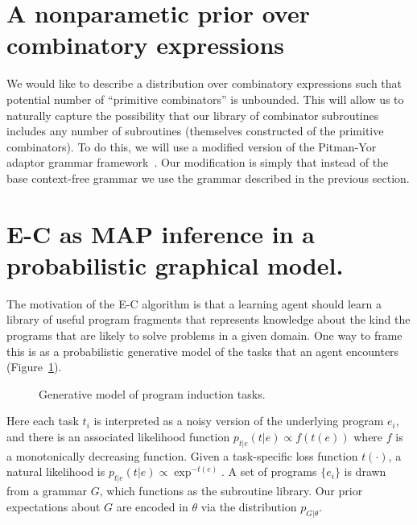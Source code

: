 \documentclass{article}
\begin{document}
\section{A nonparametic prior over combinatory expressions}
We would like to describe a distribution over combinatory expressions
such that potential number of ``primitive combinators'' is
unbounded. This will allow us to naturally capture the possibility
that our library of combinator subroutines includes any number of
subroutines (themselves constructed of the primitive combinators). To
do this, we will use a modified version of the Pitman-Yor adaptor
grammar framework~\cite{DBLP:conf/nips/JohnsonGG06}. Our modification
is simply that instead of the base context-free grammar we use the
grammar described in the previous section. 

\section{E-C as MAP inference in a probabilistic graphical model.}
The motivation of the E-C algorithm is that a learning agent should
learn a library of useful program fragments that represents knowledge
about the kind the programs that are likely to solve problems in a
given domain. One way to frame this is as a probabilistic generative
model of the tasks that an agent encounters
(Figure~\ref{fig:generativeModel}).

\begin{figure}
\caption{Generative model of program induction
  tasks. \label{fig:generativeModel}}
\end{figure}

Here each task $t_i$ is interpreted as a noisy version of the
underlying program $e_i$, and there is an associated likelihood
function $p_{t|e}(t|e) \propto f(t(e)) $ where $f$ is a monotonically
decreasing function. Given a task-specific loss function $t(\cdot)$, a
natural likelihood is $p_{t|e}(t|e) \propto \exp^{-t(e)}$. A set of
programs $\{e_i\}$ is drawn from a grammar $G$, which functions as the
subroutine library. Our prior expectations about $G$ are encoded in
$\theta$ via the distribution $p_{G|\theta}$. 
\end{document}
